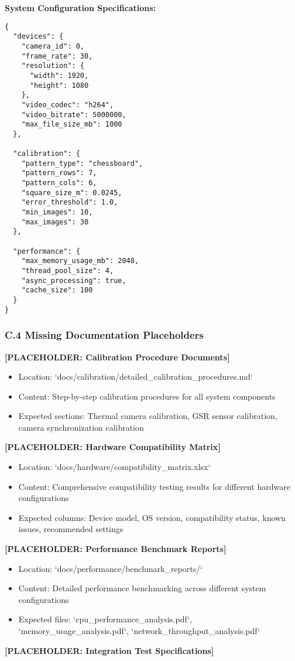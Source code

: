 \documentclass[12pt,a4paper]{article}
\begin{document}
\textbf{System Configuration Specifications:}

\begin{verbatim}
{
  "devices": {
    "camera_id": 0,
    "frame_rate": 30,
    "resolution": {
      "width": 1920,
      "height": 1080
    },
    "video_codec": "h264",
    "video_bitrate": 5000000,
    "max_file_size_mb": 1000
  },
  
  "calibration": {
    "pattern_type": "chessboard",
    "pattern_rows": 7,
    "pattern_cols": 6,
    "square_size_m": 0.0245,
    "error_threshold": 1.0,
    "min_images": 10,
    "max_images": 30
  },
  
  "performance": {
    "max_memory_usage_mb": 2048,
    "thread_pool_size": 4,
    "async_processing": true,
    "cache_size": 100
  }
}
\end{verbatim}

\subsubsection{C.4 Missing Documentation Placeholders}

\textbf{[PLACEHOLDER: Calibration Procedure Documents]}

\begin{itemize}
\item Location: `docs/calibration/detailed_calibration_procedures.md`
\item Content: Step-by-step calibration procedures for all system components
\item Expected sections: Thermal camera calibration, GSR sensor calibration, camera synchronization calibration

\end{itemize}
\textbf{[PLACEHOLDER: Hardware Compatibility Matrix]}

\begin{itemize}
\item Location: `docs/hardware/compatibility_matrix.xlsx`
\item Content: Comprehensive compatibility testing results for different hardware configurations
\item Expected columns: Device model, OS version, compatibility status, known issues, recommended settings

\end{itemize}
\textbf{[PLACEHOLDER: Performance Benchmark Reports]}

\begin{itemize}
\item Location: `docs/performance/benchmark_reports/`
\item Content: Detailed performance benchmarking across different system configurations
\item Expected files: `cpu_performance_analysis.pdf`, `memory_usage_analysis.pdf`, `network_throughput_analysis.pdf`

\end{itemize}
\textbf{[PLACEHOLDER: Integration Test Specifications]}
\end{document}
